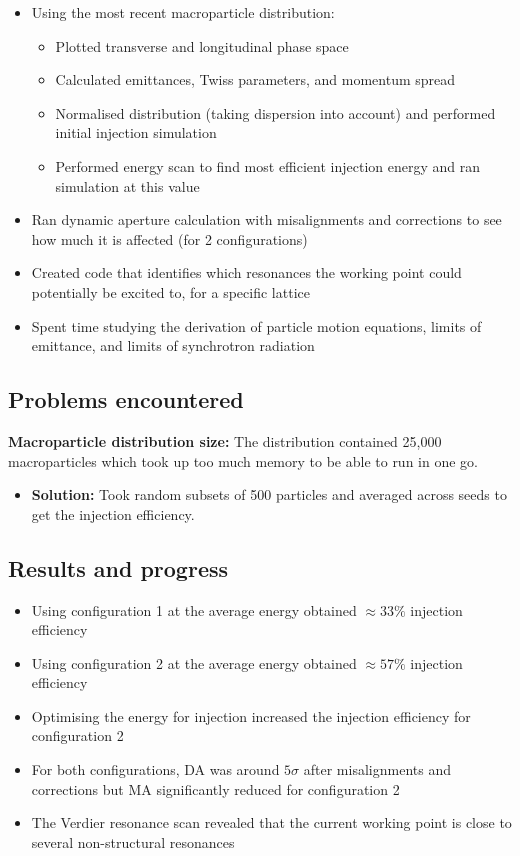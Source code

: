 \documentclass{article}
\begin{document}
\begin{itemize}
\item Using the most recent macroparticle distribution:
    \begin{itemize}
    \item Plotted transverse and longitudinal phase space
    \item Calculated emittances, Twiss parameters, and momentum spread
    \item Normalised distribution (taking dispersion into account) and performed initial injection simulation 
    \item Performed energy scan to find most efficient injection energy and ran simulation at this value 
    \end{itemize}
\item Ran dynamic aperture calculation with misalignments and corrections to see how much it is affected (for 2 configurations)
\item Created code that identifies which resonances the working point could potentially be excited to, for a specific lattice
\item Spent time studying the derivation of particle motion equations, limits of emittance, and limits of synchrotron radiation
\end{itemize}

\subsection{Problems encountered}

\textbf{Macroparticle distribution size:} The distribution contained 25,000 macroparticles which took up too much memory to be able to run in one go.
\begin{itemize}
    \item \textbf{Solution:} Took random subsets of 500 particles and averaged across seeds to get the injection efficiency.
\end{itemize}

\subsection{Results and progress}
\begin{itemize}
    \item Using configuration 1 at the average energy obtained $\approx 33\%$ injection efficiency
    \item Using configuration 2 at the average energy obtained $\approx 57\%$ injection efficiency
    \item Optimising the energy for injection increased the injection efficiency for configuration 2
    \item For both configurations, DA was around $5\sigma$ after misalignments and corrections but MA significantly reduced for configuration 2
    \item The Verdier resonance scan revealed that the current working point is close to several non-structural resonances
\end{itemize}
\end{document}

